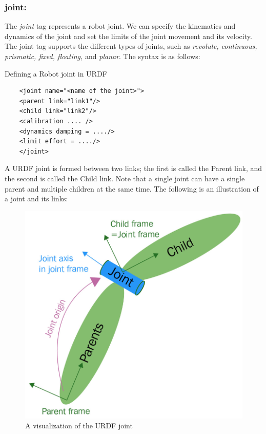 \documentclass[../../main]{subfiles}
\begin{document}
\subsubsection{joint:}
The \emph{joint} tag represents a robot joint. We can specify the kinematics and
dynamics of the joint and set the limits of the joint movement and its velocity. The
joint tag supports the different types of joints, such as \emph{revolute, continuous,
prismatic, fixed, floating,} and \emph{planar}.
The syntax is as follows:
\begin{codebox}[]{Defining a Robot joint in URDF}
  \begin{verbatim}
    <joint name="<name of the joint>">
    <parent link="link1"/>
    <child link="link2"/>
    <calibration .... />
    <dynamics damping = ..../>
    <limit effort = ..../>
    </joint>
\end{verbatim}
\end{codebox}
A URDF joint is formed between two links; the first is called the Parent link, and the
second is called the Child link. Note that a single joint can have a single parent and
multiple children at the same time. The following is an illustration of a joint and its links:
\begin{figure}[ht]
    \centering
    \includegraphics{sublatex/hashem/img/joint1.jpg}
    \caption{A visualization of the URDF joint\cite{joseph2018mastering}}
\end{figure}
\end{document}
